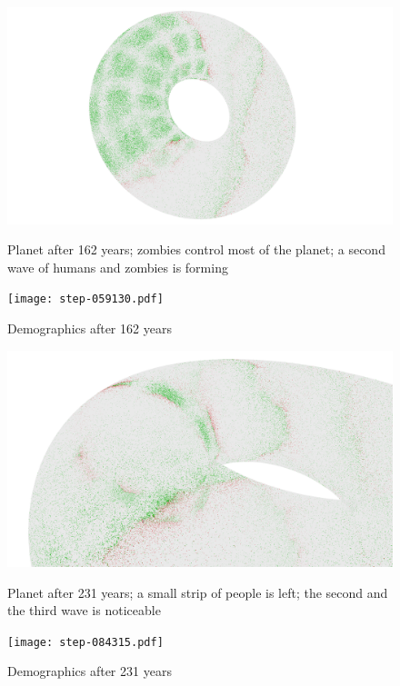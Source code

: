 \documentclass[a4paper]{article}
\begin{document}
\begin{figure}[pht]
    \centering
    \includegraphics[width=\textwidth]{torus/step-059130-torus.png}
    \caption{Planet after 162 years; zombies control most of the planet; a second wave of humans and zombies is forming}
    \texttt{[image: step-059130.pdf]}
    \caption{Demographics after 162 years}
\end{figure}

\begin{figure}[pht]
    \centering
    \includegraphics[width=\textwidth]{torus/step-084315-torus.png}
    \caption{Planet after 231 years; a small strip of people is left; the second and the third wave is noticeable}
    \texttt{[image: step-084315.pdf]}
    \caption{Demographics after 231 years}
\end{figure}
\end{document}
